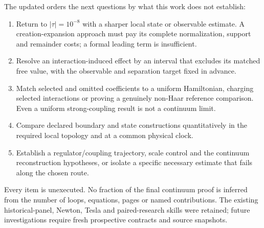 The updated
orders the next questions by what this work does not establish:
\begin{enumerate}
\item Return to $|\tau|=10^{-8}$ with a sharper local state or observable
estimate. A creation-expansion approach must pay its complete normalization,
support and remainder costs; a formal leading term is insufficient.
\item Resolve an interaction-induced effect by an interval that excludes its
matched free value, with the observable and separation target fixed in advance.
\item Match selected and omitted coefficients to a uniform Hamiltonian,
charging selected interactions or proving a genuinely non-Haar reference
comparison. Even a uniform strong-coupling result is not a continuum limit.
\item Compare declared boundary and state constructions quantitatively in the
required local topology and at a common physical clock.
\item Establish a regulator/coupling trajectory, scale control and the
continuum reconstruction hypotheses, or isolate a specific necessary estimate
that fails along the chosen route.
\end{enumerate}
Every item is unexecuted. No fraction of the final continuum proof is inferred
from the number of loops, equations, pages or named contributions. The existing
historical-panel, Newton, Tesla and paired-research skills were retained; future
investigations require fresh prospective contracts and source snapshots.
